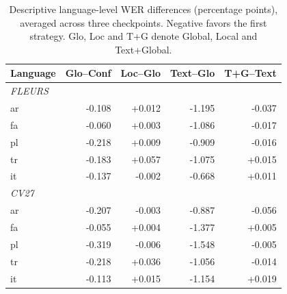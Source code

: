 \begin{table}[t]\centering\setlength{\tabcolsep}{3.6pt}
\caption{Descriptive language-level WER differences (percentage points), averaged across three checkpoints. Negative favors the first strategy. Glo, Loc and T+G denote Global, Local and Text+Global.}\label{tab:languages}
\begin{tabular}{lrrrr}\toprule
Language & Glo--Conf & Loc--Glo & Text--Glo & T+G--Text \\\midrule
\multicolumn{5}{l}{\textit{FLEURS}}\\
ar & -0.108 & +0.012 & -1.195 & -0.037 \\
fa & -0.060 & +0.003 & -1.086 & -0.017 \\
pl & -0.218 & +0.009 & -0.909 & -0.016 \\
tr & -0.183 & +0.057 & -1.075 & +0.015 \\
it & -0.137 & -0.002 & -0.668 & +0.011 \\\midrule
\multicolumn{5}{l}{\textit{CV27}}\\
ar & -0.207 & -0.003 & -0.887 & -0.056 \\
fa & -0.055 & +0.004 & -1.377 & +0.005 \\
pl & -0.319 & -0.006 & -1.548 & -0.005 \\
tr & -0.218 & +0.036 & -1.056 & -0.014 \\
it & -0.113 & +0.015 & -1.154 & +0.019 \\\bottomrule
\end{tabular}\end{table}
